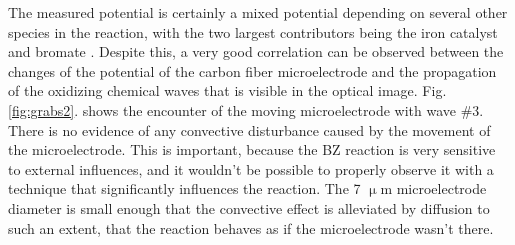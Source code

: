 \documentclass[3p]{elsarticle}
\begin{document}
The measured potential is certainly a mixed potential depending on several other species in the reaction, with the two largest contributors being the iron catalyst and bromate \cite{field1972oscillations}.
Despite this, a very good correlation can be observed between the changes of the potential of the carbon fiber microelectrode and the propagation of the oxidizing chemical waves that is visible in the optical image.
Fig. \ref{fig:grabs2}. shows the encounter of the moving microelectrode with wave \#3.
There is no evidence of any convective disturbance caused by the movement of the microelectrode.
This is important, because the BZ reaction is very sensitive to external influences, and it wouldn't be possible to properly observe it with a technique that significantly influences the reaction.
The 7 $\upmu$m microelectrode diameter is small enough that the convective effect is alleviated by diffusion to such an extent, that the reaction behaves as if the microelectrode wasn't there.
\end{document}
